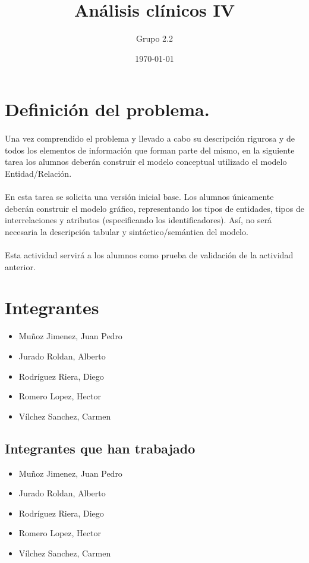 \documentclass[a4paper,10pt]{article}
\title{Análisis clínicos IV}
\author{Grupo 2.2}
\date{\today}
\begin{document}
\maketitle
\pagebreak

\section{Definición del problema.}
\paragraph{}
Una  vez  comprendido  el  problema  y  llevado  a  cabo su descripción  rigurosa y  de  todos los  elementos  de  información  que forman  parte del  mismo,  en  la siguiente  tarea  los alumnos deberán construir el modelo conceptual utilizado el modelo Entidad/Relación.
\paragraph{}
En  esta  tarea  se  solicita  una  versión  inicial  base. Los  alumnos únicamente  deberán construir el modelo gráfico, representando los tipos de entidades, tipos de interrelaciones y atributos (especificando los identificadores). Así, no será necesaria la descripción tabular y sintáctico/semántica del modelo.
\paragraph{}
Esta actividad servirá a los alumnos como prueba de validación de la actividad anterior.



\section{Integrantes}
\begin{itemize}
  \item Muñoz Jimenez, Juan Pedro
  \item Jurado Roldan, Alberto
	\item Rodríguez Riera, Diego
  \item Romero Lopez, Hector
  \item Vílchez Sanchez, Carmen
\end{itemize}

\subsection{Integrantes que han trabajado}
\begin{itemize}
  \item Muñoz Jimenez, Juan Pedro
  \item Jurado Roldan, Alberto
	\item Rodríguez Riera, Diego
  \item Romero Lopez, Hector
  \item Vílchez Sanchez, Carmen
\end{itemize}
\end{document}
